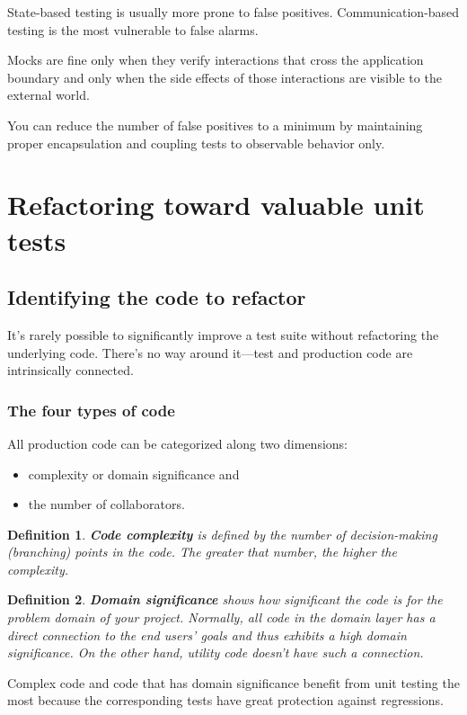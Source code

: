 \documentclass{article}
\newtheorem{definition}{Definition}
\begin{document}
State-based testing is usually more prone to false positives.  Communication-based testing is the most vulnerable to false alarms.

Mocks are fine only when they verify interactions that cross the application boundary and only when the side effects of those interactions are visible to the external world.

You can reduce the number of false positives to a minimum by maintaining proper encapsulation and coupling tests to observable behavior only.

\section{Refactoring toward valuable unit tests}

\subsection{Identifying the code to refactor}
It’s rarely possible to significantly improve a test suite without refactoring the underlying code. There’s no way around it—test and production code are intrinsically connected.

\subsubsection{The four types of code}
All production code can be categorized along two dimensions:
\begin{itemize}
	\item complexity or domain significance and
	\item the number of collaborators.
\end{itemize}

\begin{definition}
\textbf{Code complexity} is defined by the number of decision-making (branching) points in the code. The greater that number, the higher the complexity.
\end{definition}

\begin{definition}
\textbf{Domain significance} shows how significant the code is for the problem domain of your project. Normally, all code in the domain layer has a direct connection to the end users’ goals and thus exhibits a high domain significance. On the other hand, utility code doesn’t have such a connection.
\end{definition}

Complex code and code that has domain significance benefit from unit testing the most because the corresponding tests have great protection against regressions.
\end{document}
